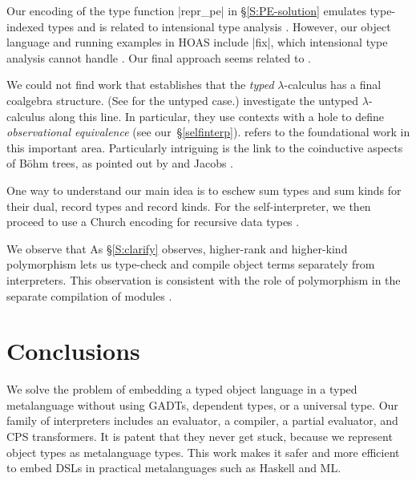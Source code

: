 Our encoding of the type function |repr_pe| in \S\ref{S:PE-solution}
emulates type-indexed types and is related to intensional type analysis
\citep{Morrisett-intensional,Generic-Haskell}. However, our object
language and running examples in HOAS include |fix|,
which intensional type analysis cannot handle
\citep{xi-guarded}.  Our final approach
seems related to \citet{Washburn-Weirich-boxes}.


We could not find work that establishes that
the \emph{typed} $\lambda$-calculus has a final coalgebra structure.
\ifshort
(See  for the untyped case.)
\else
{}
investigate the untyped $\lambda$-calculus
along this line.  
In particular, they use
contexts with a hole \citep[p.\,13]{honsell99coinductive} to define
\emph{observational equivalence}
(see our~\S\ref{selfinterp}).
 refers to the
foundational work in this important area.  
Particularly intriguing is the link to the
coinductive aspects of B\"{o}hm trees, as pointed out by
\citet{berarducci-models} and Jacobs \citeyearpar[Example 4.3.4]{jacobs-coalgebra}.
\fi

\ifshort\else
One way to understand our main idea is to eschew sum types and sum kinds
for their dual, record types and record kinds.
For the self\hyp interpreter, we then proceed to use a Church encoding for
recursive data types \citep{bohm-automatic}.
\fi

\ifshort We observe that \else As \S\ref{S:clarify} observes, \fi
higher-rank and higher-kind
polymorphism lets us type-check and compile object terms separately from
interpreters.  This \ifshort\else observation \fi is consistent with the role of
polymorphism in the separate compilation of modules
\citep{shao-typed}.

\section{Conclusions}\label{conclusion}

We solve the problem of embedding a typed object language in a typed
metalanguage without using GADTs, dependent types, or a universal type.
Our family of interpreters includes an evaluator, a compiler, a partial
evaluator, and CPS transformers.  It is patent that they never get stuck,
because we represent object types as metalanguage types.  This work
makes it safer and more efficient to embed DSLs
in practical metalanguages such as Haskell and ML\@.

